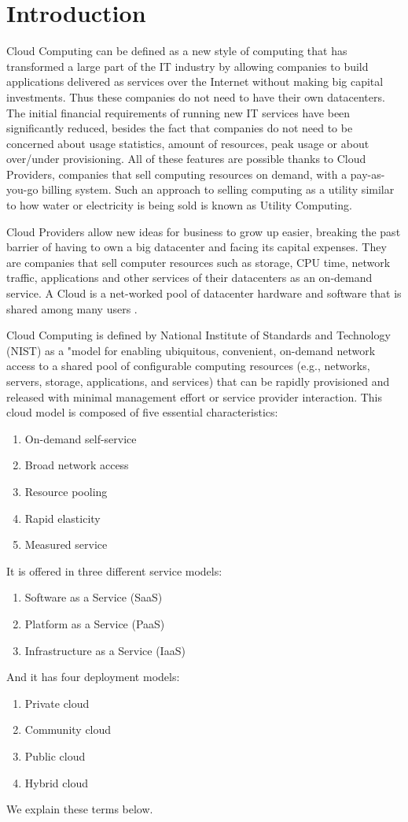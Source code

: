 \chapter{Introduction}
\label{chapter:intro}


Cloud Computing can be defined as a new style of computing that has transformed a large part of the IT industry by allowing companies to build applications delivered as services over the Internet without making big capital investments. 
Thus these companies do not need to have their own datacenters. The initial financial requirements of running new IT services have been significantly reduced, besides the fact that companies do not need to be concerned about usage statistics, amount of resources, peak usage or about over/under provisioning. All of these features are possible thanks to Cloud Providers, companies that sell computing resources on demand, with a pay-as-you-go billing system. Such an approach to selling computing as a utility similar to how water or electricity is being sold is known as Utility Computing.
\par
Cloud Providers allow new ideas for business to grow up easier, breaking the past barrier of having to own a big datacenter and facing its capital expenses. They are companies that sell computer resources such as storage, CPU time, network traffic, applications and other services of their datacenters as an on-demand service. A Cloud is a net-worked pool of datacenter hardware and software that is shared among many users \cite{fox2009above}.
\par
Cloud Computing is defined by National Institute of Standards and Technology (NIST) \cite{mell2011nist} as a "model for enabling ubiquitous, convenient, on-demand network access to a shared pool of configurable computing resources (e.g., networks, servers, storage, applications, and services) that can be rapidly provisioned and released with minimal management effort or service provider interaction. This cloud model is composed of five essential characteristics:
\begin{enumerate}
\item On-demand self-service
\item Broad network access
\item Resource pooling
\item Rapid elasticity
\item Measured service
\end{enumerate}
It is offered in three different service models:
\begin{enumerate}
\item Software as a Service (SaaS)
\item Platform as a Service (PaaS)
\item Infrastructure as a Service (IaaS)
\end{enumerate}
And it has four deployment models: 
\begin{enumerate}
\item Private cloud
\item Community cloud
\item Public cloud
\item Hybrid cloud 
\end{enumerate}
We explain these terms below.

